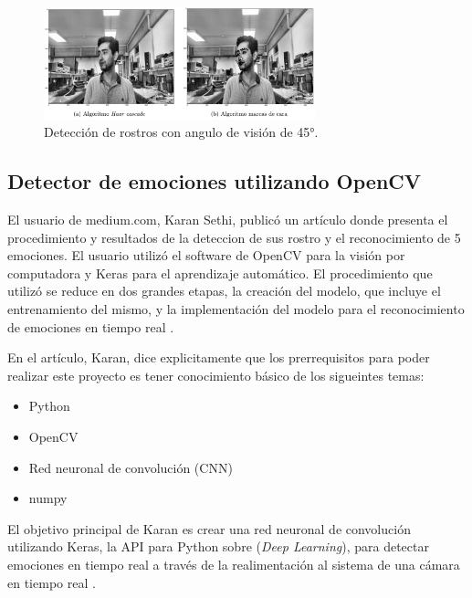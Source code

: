 \begin{figure}[h]
    \centering
    \includegraphics[width=0.7\textwidth]{figuras/Ruano_Result.png}
    \caption{Detección de rostros con angulo de visión de 45°. \cite{Ruano2019Tesis}}
    \label{fig:RuanoResult}
\end{figure}

\newpage
\subsection*{Detector de emociones utilizando OpenCV}
El usuario de medium.com, Karan  Sethi, publicó un artículo donde presenta el procedimiento y resultados de la deteccion de sus rostro y el reconocimiento de 5 emociones. El usuario utilizó el software de OpenCV para la visión por computadora y Keras para el aprendizaje automático. El procedimiento que utilizó se reduce en dos grandes etapas, la creación del modelo, que incluye el entrenamiento del mismo, y la implementación del modelo para el reconocimiento de emociones en tiempo real \cite{Karan}.

En el artículo, Karan, dice explicitamente que los prerrequisitos para poder realizar este proyecto es tener conocimiento básico de los sigueintes temas:
\begin{itemize}
\item Python
\item OpenCV
\item Red neuronal de convolución (CNN)
\item numpy
\end{itemize}

El objetivo principal de Karan es crear una red neuronal de convolución utilizando Keras, la API para Python sobre (\textit{Deep Learning}), para detectar emociones en tiempo real a través de la realimentación al sistema de una cámara en tiempo real \cite{Karan}.

